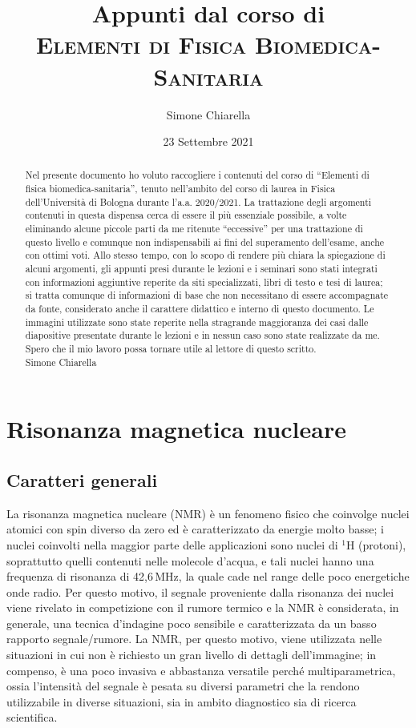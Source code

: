 \documentclass{report}
\title{Appunti dal corso di\\\vspace{10 pt} \textsc{\huge Elementi di Fisica Biomedica-Sanitaria}}
\author{Simone Chiarella}
\date{23 Settembre 2021}
\newcommand{\virgolette}[1]{``#1''}
\numberwithin{equation}{section}
\numberwithin{figure}{section}
\begin{document}
\maketitle
\shipout\hbox{}

\begin{abstract}
\large{Nel presente documento ho voluto raccogliere i contenuti del corso di \virgolette{Elementi di fisica biomedica-sanitaria}, tenuto nell'ambito del corso di laurea in Fisica dell'Università di Bologna durante l'a.a. 2020/2021. La trattazione degli argomenti contenuti in questa dispensa cerca di essere il più essenziale possibile, a volte eliminando alcune piccole parti da me ritenute \virgolette{eccessive} per una trattazione di questo livello e comunque non indispensabili ai fini del superamento dell'esame, anche con ottimi voti. Allo stesso tempo, con lo scopo di rendere più chiara la spiegazione di alcuni argomenti, gli appunti presi durante le lezioni e i seminari sono stati integrati con informazioni aggiuntive reperite da siti specializzati, libri di testo e tesi di laurea; si tratta comunque di informazioni di base che non necessitano di essere accompagnate da fonte, considerato anche il carattere didattico e interno di questo documento. Le immagini utilizzate sono state reperite nella stragrande maggioranza dei casi dalle diapositive presentate durante le lezioni e in nessun caso sono state realizzate da me.\\
Spero che il mio lavoro possa tornare utile al lettore di questo scritto.\\

\hspace{350 pt} Simone Chiarella}
\end{abstract}
\shipout\hbox{}

\tableofcontents

\chapter{Risonanza magnetica nucleare}

\section{Caratteri generali}
La risonanza magnetica nucleare (NMR) è un fenomeno fisico che coinvolge nuclei atomici con spin diverso da zero ed è caratterizzato da energie molto basse; i nuclei coinvolti nella maggior parte delle applicazioni sono nuclei di $\mathrm{^1H}$ (protoni), soprattutto quelli contenuti nelle molecole d'acqua, e tali nuclei hanno una frequenza di risonanza di 42,6\,MHz, la quale cade nel range delle poco energetiche onde radio. Per questo motivo, il segnale proveniente dalla risonanza dei nuclei viene rivelato in competizione con il rumore termico e la NMR è considerata, in generale, una tecnica d'indagine poco sensibile e caratterizzata da un basso rapporto segnale/rumore. La NMR, per questo motivo, viene utilizzata nelle situazioni in cui non è richiesto un gran livello di dettagli dell'immagine; in compenso, è una poco invasiva e abbastanza versatile perché multiparametrica, ossia l'intensità del segnale è pesata su diversi parametri che la rendono utilizzabile in diverse situazioni, sia in ambito diagnostico sia di ricerca scientifica.
\end{document}

